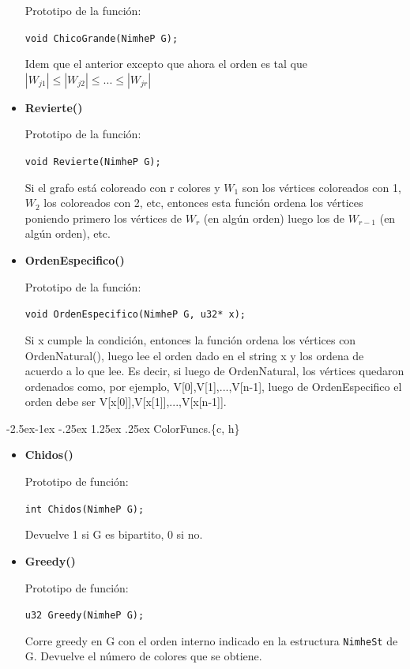 \documentclass[11pt,a4paper]{article}
\makeatletter
\renewcommand\paragraph{\@startsection{paragraph}{4}{\z@}%
            {-2.5ex\@plus -1ex \@minus -.25ex}%
            {1.25ex \@plus .25ex}%
            {\normalfont\normalsize\bfseries}}
\theoremstyle{plain}
\makeatother
\begin{document}
\begin{itemize}
Prototipo de la función:

\texttt{void ChicoGrande(NimheP G);}

Idem que el anterior excepto que ahora el orden es tal que $|W_{j1}| \leq |W_{j2}| \leq ... \leq |W_{jr}|$

\item{\textbf{{Revierte()}}}

Prototipo de la función:

\texttt{void Revierte(NimheP G);}

Si el grafo está coloreado con r colores y $W_{1}$ son los vértices coloreados con 1, $W_{2}$ los coloreados con 2, etc, entonces esta función ordena los vértices poniendo primero los vértices de $W_{r}$ (en algún orden) luego los de $W_{r-1}$ (en algún orden), etc. 

\item{\textbf{{OrdenEspecifico()}}}

Prototipo de la función:

\texttt{void OrdenEspecifico(NimheP G, u32* x);}

Si x cumple la condición, entonces la función ordena los vértices con OrdenNatural(), luego lee el orden dado en el string x y los ordena de acuerdo a lo que lee. Es decir, si luego de OrdenNatural, los vértices quedaron ordenados como, por ejemplo, V[0],V[1],...,V[n-1], luego de OrdenEspecifico el orden debe ser V[x[0]],V[x[1]],...,V[x[n-1]].

\end{itemize}

				\paragraph{ColorFuncs.\{c, h\}}

\begin{itemize}
\item{\textbf{{Chidos()}}}

Prototipo de función:

\texttt{int Chidos(NimheP G);}

Devuelve 1 si G es bipartito, 0 si no.

\item{\textbf{{Greedy()}}}

Prototipo de función:

\texttt{u32 Greedy(NimheP G);}

Corre greedy en G con el orden interno indicado en la estructura \texttt{NimheSt} de G. Devuelve el número de colores que se obtiene.

\end{itemize}
\end{document}
